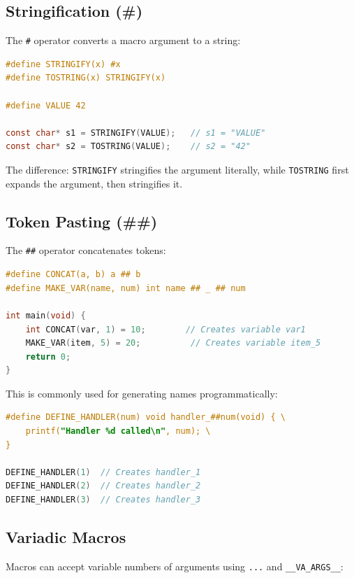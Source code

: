 \subsection{Stringification (\#)}

The \texttt{\#} operator converts a macro argument to a string:

\begin{lstlisting}[language=C]
#define STRINGIFY(x) #x
#define TOSTRING(x) STRINGIFY(x)

#define VALUE 42

const char* s1 = STRINGIFY(VALUE);   // s1 = "VALUE"
const char* s2 = TOSTRING(VALUE);    // s2 = "42"
\end{lstlisting}

The difference: \texttt{STRINGIFY} stringifies the argument literally, while \texttt{TOSTRING} first expands the argument, then stringifies it.

\subsection{Token Pasting (\#\#)}

The \texttt{\#\#} operator concatenates tokens:

\begin{lstlisting}[language=C]
#define CONCAT(a, b) a ## b
#define MAKE_VAR(name, num) int name ## _ ## num

int main(void) {
    int CONCAT(var, 1) = 10;        // Creates variable var1
    MAKE_VAR(item, 5) = 20;          // Creates variable item_5
    return 0;
}
\end{lstlisting}

This is commonly used for generating names programmatically:

\begin{lstlisting}[language=C]
#define DEFINE_HANDLER(num) void handler_##num(void) { \
    printf("Handler %d called\n", num); \
}

DEFINE_HANDLER(1)  // Creates handler_1
DEFINE_HANDLER(2)  // Creates handler_2
DEFINE_HANDLER(3)  // Creates handler_3
\end{lstlisting}

\subsection{Variadic Macros}

Macros can accept variable numbers of arguments using \texttt{...} and \texttt{\_\_VA\_ARGS\_\_}:

